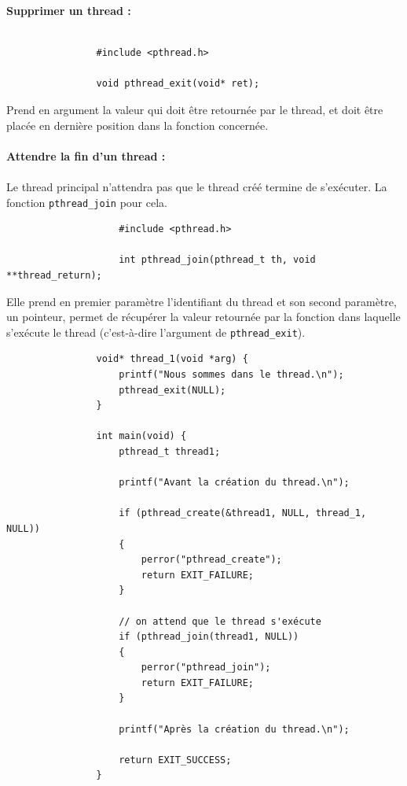 		\begin{frame}[containsverbatim]
			\textbf{Supprimer un thread :}
			\\~\\
			\begin{lstlisting}
				#include <pthread.h>

				void pthread_exit(void* ret);
			\end{lstlisting}
			Prend en argument la valeur qui doit être retournée par le thread, et doit être placée en dernière position dans la fonction concernée.
			\\~\\
			\textbf{Attendre la fin d'un thread :}
			\\~\\
				Le thread principal n'attendra pas que le thread créé termine de s'exécuter. La fonction \lstinline!pthread_join! pour cela.
				\begin{lstlisting}
					#include <pthread.h>

					int pthread_join(pthread_t th, void **thread_return);
				\end{lstlisting}
				Elle prend en premier paramètre l'identifiant du thread et son second paramètre, un pointeur, permet de récupérer la valeur retournée par la fonction dans laquelle s'exécute le thread (c'est-à-dire l'argument de \lstinline!pthread_exit!).
		\end{frame}
		
		\begin{frame}[containsverbatim]
			\begin{lstlisting}
				void* thread_1(void *arg) {
					printf("Nous sommes dans le thread.\n");
					pthread_exit(NULL);
				}

				int main(void) {
					pthread_t thread1;

					printf("Avant la création du thread.\n");

					if (pthread_create(&thread1, NULL, thread_1, NULL)) 
					{
						perror("pthread_create");
						return EXIT_FAILURE;
					}
					
					// on attend que le thread s'exécute
					if (pthread_join(thread1, NULL)) 
					{
						perror("pthread_join");
						return EXIT_FAILURE;
					}

					printf("Après la création du thread.\n");

					return EXIT_SUCCESS;
				}
			\end{lstlisting}
		\end{frame}	
		
